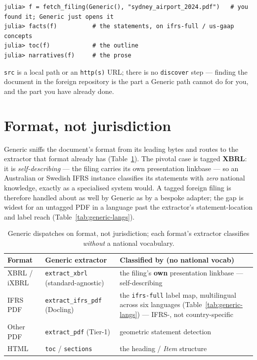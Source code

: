 \documentclass[11pt,a4paper]{report}
\begin{document}
\begin{lstlisting}
julia> f = fetch_filing(Generic(), "sydney_airport_2024.pdf")   # you found it; Generic just opens it
julia> facts(f)          # the statements, on ifrs-full / us-gaap concepts
julia> toc(f)            # the outline
julia> narratives(f)     # the prose
\end{lstlisting}

\noindent \texttt{src} is a local path or an \texttt{http(s)} URL; there is no \texttt{discover} step ---
finding the document in the foreign repository is the part a Generic path cannot do for you, and the part you
have already done.

\section{Format, not jurisdiction}
\label{sec:generic-format}

Generic sniffs the document's format from its leading bytes and routes to the extractor that format already
has (Table~\ref{tab:generic-formats}). The pivotal case is tagged \textbf{XBRL}: it is \emph{self-describing}
--- the filing carries its own presentation linkbase --- so an Australian or Swedish IFRS instance classifies
its statements with \emph{zero} national knowledge, exactly as a specialised system would. A tagged foreign
filing is therefore handled about as well by Generic as by a bespoke adapter; the gap is widest for an
untagged PDF in a language past the extractor's statement-location and label reach (Table~\ref{tab:generic-langs}).

\begin{table}[h]
\centering
\small
\caption{Generic dispatches on format, not jurisdiction; each format's extractor classifies \emph{without} a
national vocabulary.}
\label{tab:generic-formats}
\begin{tabular}{@{}p{}p{}p{}@{}}
\toprule
\textbf{Format} & \textbf{Generic extractor} & \textbf{Classified by (no national vocab)} \\
\midrule
XBRL / iXBRL & \texttt{extract\_xbrl} (standard-agnostic) & the filing's \textbf{own} presentation linkbase ---
  self-describing \\
IFRS PDF & \texttt{extract\_ifrs\_pdf} (Docling) & the \texttt{ifrs-full} label map, multilingual across six
  languages (Table~\ref{tab:generic-langs}) --- IFRS-, not country-specific \\
Other PDF & \texttt{extract\_pdf} (Tier-1) & geometric statement detection \\
HTML & \texttt{toc} / \texttt{sections} & the heading / \emph{Item} structure \\
\bottomrule
\end{tabular}
\end{table}
\end{document}
